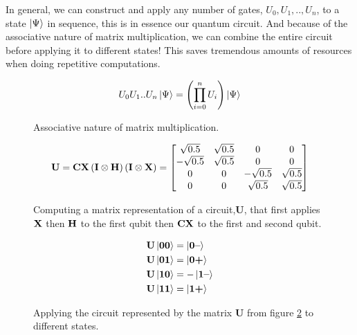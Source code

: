 \vspace{\baselineskip}
\noindent
In general, we can construct and apply any number of gates, $U_0,U_1,..,U_n$, to a state $\ket{\Psi}$ in sequence, this is in essence our quantum circuit.  
And because of the associative nature of matrix multiplication, we can combine the entire circuit before applying it to different states!
This saves tremendous amounts of resources when doing repetitive computations. 
\begin{figure}[H]
    \centering
    \begin{gather*}
        U_0 U_1 .. U_n \ket{\Psi} = \left(\prod_{i=0}^n U_i\right) \ket{\Psi}\\
    \end{gather*}
    \caption{Associative nature of matrix multiplication.}
    \label{fig:assosiative}
\end{figure}

\begin{figure}[H]
    \centering
    \begin{align*}
        \mathbf{U}=\mathbf{CX}  \left(\mathbf{I}\otimes\mathbf{H}\right) \left(\mathbf{I}\otimes\mathbf{X}\right)        =
        \begin{bmatrix}
            \sqrt{0.5}  &  \sqrt{0.5} & 0 & 0 \\
            -\sqrt{0.5} &  \sqrt{0.5} & 0 & 0 \\
            0 & 0 & -\sqrt{0.5} & \sqrt{0.5} \\
            0 & 0 & \sqrt{0.5}  & \sqrt{0.5} \\
        \end{bmatrix}
    \end{align*}
    \caption{Computing a matrix representation of a circuit,$\mathbf{U}$, that first applies $\mathbf{X}$ then $\mathbf{H}$ to the first qubit then $\mathbf{CX}$ to the first and second qubit.}
    \label{fig:circuit_matrix}
\end{figure}
\begin{figure}[H]
    \begin{align*}
        \mathbf{U}\ket{\mathbf{0}\mathbf{0}}&=\ket{\mathbf{0}\textbf{--}}\\
        \mathbf{U}\ket{\mathbf{0}\mathbf{1}}&=\ket{\mathbf{0}\textbf{+}}\\
        \mathbf{U}\ket{\mathbf{1}\mathbf{0}}&=-\ket{\mathbf{1}\textbf{--}}\\
        \mathbf{U}\ket{\mathbf{1}\mathbf{1}}&=\ket{\mathbf{1}\textbf{+}}
    \end{align*}
    \caption{Applying the circuit represented by the matrix $\mathbf{U}$ from figure \ref{fig:circuit_matrix} to different states.}
    \label{fig:applying_circuit}
\end{figure}


